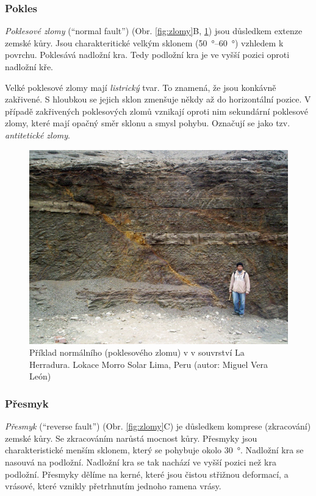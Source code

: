 \subsubsection{Pokles}
\emph{Poklesové zlomy} (\enquote{normal fault}) (Obr. \ref{fig:zlomy}B, \ref{fig:pokles}) jsou důsledkem extenze zemské kůry. Jsou charakteritické velkým sklonem (\SIrange{50}{60}{\degree}) vzhledem k povrchu. Poklesává nadložní kra. Tedy podložní kra je ve vyšší pozici oproti nadložní kře. 

Velké poklesové zlomy mají \emph{listrický} tvar. To znamená, že jsou konkávně zakřivené. S hloubkou se jejich sklon zmenšuje někdy až do horizontální pozice. V případě zakřivených poklesových zlomů vznikají oproti nim sekundární poklesové zlomy, které mají opačný směr sklonu a smysl pohybu. Označují se jako tzv. \emph{antitetické zlomy}.

\begin{figure}
	\centering
	\includegraphics[width=1\linewidth]{obrazky/tectonic/pokles}
	\caption{Příklad normálního (poklesového zlomu) v v souvrství La Herradura. Lokace Morro Solar Lima, Peru (autor: Miguel Vera León)}
	\label{fig:pokles}
\end{figure}

\subsubsection{Přesmyk}
\emph{Přesmyk} (\enquote{reverse fault}) (Obr. \ref{fig:zlomy}C) je důsledkem komprese (zkracování) zemské kůry. Se zkracováním narůstá mocnost kůry. Přesmyky jsou charakteristické menším sklonem, který se pohybuje okolo \SI{30}{\degree}. Nadložní kra se nasouvá na podložní. Nadložní kra se tak nachází ve vyšší pozici než kra podložní. 
Přesmyky dělíme na kerné, které jsou čistou střižnou deformací, a vrásové, které vznikly přetrhnutím jednoho ramena vrásy.

